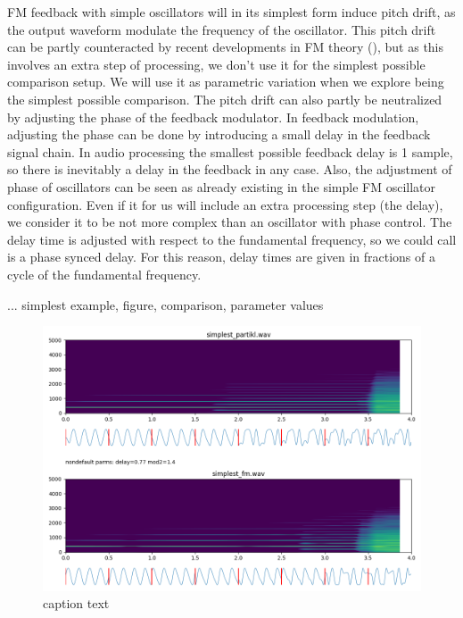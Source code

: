 \documentclass[runningheads,a4paper]{llncs}
\begin{document}
FM feedback with simple oscillators will in its simplest form induce pitch drift, as the output waveform modulate the frequency of the oscillator. This pitch drift can be partly counteracted by recent developments in FM theory (\cite{Lazzarini-2024}), but as this involves an extra step of processing, we don't use it for the simplest possible comparison setup. We will use it as parametric variation when we explore being the simplest possible comparison. The pitch drift can also partly be neutralized by adjusting the phase of the feedback modulator. In feedback modulation, adjusting the phase can be done by introducing a small delay in the feedback signal chain. In audio processing the smallest possible feedback delay is 1 sample, so there is inevitably a delay in the feedback in any case. Also, the adjustment of phase of oscillators can be seen as already existing in the simple FM oscillator configuration. Even if it for us will include an extra processing step (the delay), we consider it to be not more complex than an oscillator with phase control. The delay time is adjusted with respect to the fundamental frequency, so we could call is a phase synced delay. For this reason, delay times are given in fractions of a cycle of the fundamental frequency. 

... simplest example, figure, comparison, parameter values
\begin{figure}
	\centering
	\includegraphics[width=.95\textwidth]{simplest_comparison.png}
	\caption{caption text}
	\label{fig:simplest}
\end{figure}
\end{document}
